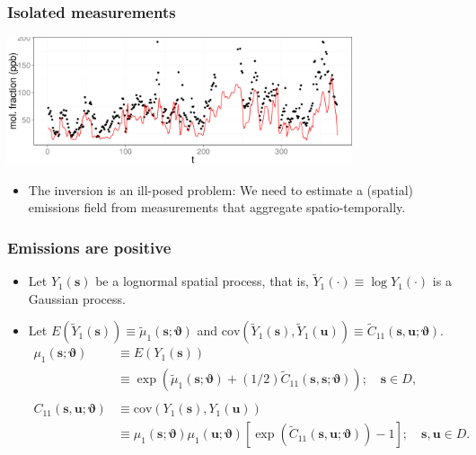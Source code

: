 \documentclass{beamer}
\newcommand{\svec} {\textbf{s}}
\newcommand{\uvec} {\textbf{u}}
\newcommand{\s}{\mathbf{s}}
\renewcommand{\u}{\mathbf{u}}
\newcommand{\E}{E}
\newcommand{\cov}{\mathrm{cov}}
\newcommand{\varthetab} {{\boldsymbol{\vartheta}}}
\begin{document}

\begin{frame}
\frametitle{Isolated measurements}

\begin{center}
\includegraphics[width=4in]{TAC_01.png}  
\end{center}

\vspace{-1cm}

\begin{itemize}
\small
\item The inversion is an ill-posed problem: We need to estimate a (spatial) emissions field from measurements that aggregate spatio-temporally.
\end{itemize}

\normalsize

\end{frame}

\begin{frame}
\frametitle{Emissions are positive}

\begin{itemize}

\item Let $Y_1(\svec)$ be a lognormal spatial process, that is, $\widetilde{Y}_1(\cdot) \equiv \log Y_1(\cdot)$ is a Gaussian process.
\item Let $\E(\widetilde{Y}_1(\s)) \equiv \widetilde\mu_1(\s;\varthetab)$ and $\cov(\widetilde{Y}_1(\s),\widetilde{Y}_1(\u)) \equiv \widetilde{C}_{11}(\s,\u; \varthetab)$.
\begin{align*}
\mu_1(\s;\varthetab) &\equiv \E(Y_1(\s)) \\ &\equiv  \exp(\widetilde{\mu}_1(\svec;\varthetab) + (1/2)\widetilde{C}_{11}(\s,\s;\varthetab)); \quad \svec \in D,\\
&\\
 C_{11}(\s,\u;\varthetab) &\equiv \cov(Y_1(\s),Y_1(\u)) 
\\&\equiv \mu_1(\s;\varthetab)\mu_1(\u;\varthetab)[\exp(\widetilde{C}_{11}(\s,\u;\varthetab)) - 1] ; \quad \svec,\uvec \in D.
\end{align*}
\end{itemize}

\end{frame}
\end{document}
